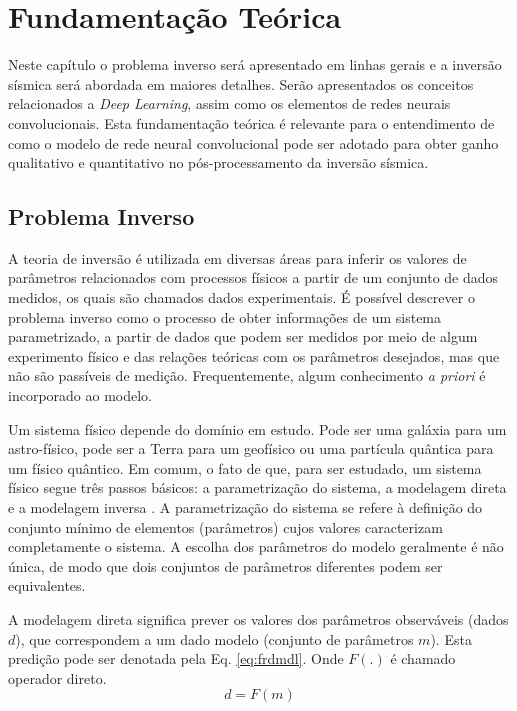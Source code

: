 \chapter{Fundamentação Teórica}
\label{cap:2fundamentacao}
Neste capítulo o problema inverso será apresentado
em linhas gerais e a inversão sísmica será abordada em maiores detalhes.
Serão apresentados os conceitos relacionados a \textit{Deep Learning}, assim como os
elementos de redes neurais convolucionais. Esta fundamentação
teórica é relevante para o entendimento de como o modelo de rede neural convolucional
pode ser adotado para obter ganho qualitativo e quantitativo no pós-processamento
da inversão sísmica.

\section{Problema Inverso}
A teoria de inversão é utilizada em diversas áreas para inferir os valores de
parâmetros relacionados com processos físicos a partir de um conjunto de dados medidos,
os quais são chamados dados experimentais. É possível descrever o problema inverso
como o processo de obter informações de um sistema parametrizado, a partir de
dados que podem ser medidos por meio de algum experimento físico e das relações teóricas com os parâmetros
desejados, mas que não são passíveis de medição. Frequentemente, algum conhecimento \textit{a priori}
é incorporado ao modelo.

Um sistema físico depende do domínio em estudo. Pode ser uma galáxia para um
astro-físico, pode ser a Terra para um geofísico ou uma partícula quântica
para um físico quântico. Em comum, o fato de que, para ser estudado, um sistema
físico segue três passos básicos: a parametrização do sistema, a modelagem direta e a modelagem inversa \citep{tarantola}.
A parametrização do sistema se refere à definição do conjunto mínimo de elementos (parâmetros)
cujos valores caracterizam completamente o sistema. A escolha dos parâmetros do modelo geralmente
é não única, de modo que dois conjuntos de parâmetros diferentes podem ser equivalentes.

A modelagem direta significa prever os valores dos parâmetros observáveis (dados $d$),
que correspondem a um dado modelo (conjunto de parâmetros $m$). Esta predição pode ser denotada
pela Eq. \ref{eq:frdmdl}. Onde $F(.)$ é chamado operador direto.
\begin{equation}
\label{eq:frdmdl}
d = F(m) 
\end{equation}

